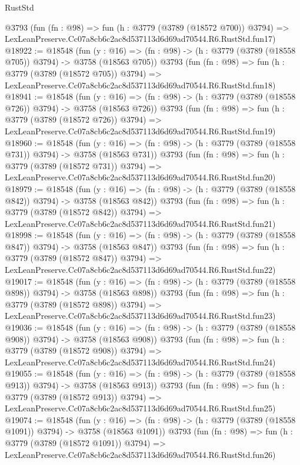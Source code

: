 \begin{lexlean}{RustStd}
\begin{coremodule}
    @3793
    (fun (fn : @98) =>
    fun (h : @3779 (@3789 (@18572 @700)) @3794) =>
    LexLeanPreserve.Cc07a8cb6c2ac8d537113d6d69ad70544.R6.RustStd.fun17)
@18922 := @18548
    (fun (y : @16) => (fn : @98) -> (h : @3779 (@3789 (@18558 @705)) @3794) -> @3758 (@18563 @705))
    @3793
    (fun (fn : @98) =>
    fun (h : @3779 (@3789 (@18572 @705)) @3794) =>
    LexLeanPreserve.Cc07a8cb6c2ac8d537113d6d69ad70544.R6.RustStd.fun18)
@18941 := @18548
    (fun (y : @16) => (fn : @98) -> (h : @3779 (@3789 (@18558 @726)) @3794) -> @3758 (@18563 @726))
    @3793
    (fun (fn : @98) =>
    fun (h : @3779 (@3789 (@18572 @726)) @3794) =>
    LexLeanPreserve.Cc07a8cb6c2ac8d537113d6d69ad70544.R6.RustStd.fun19)
@18960 := @18548
    (fun (y : @16) => (fn : @98) -> (h : @3779 (@3789 (@18558 @731)) @3794) -> @3758 (@18563 @731))
    @3793
    (fun (fn : @98) =>
    fun (h : @3779 (@3789 (@18572 @731)) @3794) =>
    LexLeanPreserve.Cc07a8cb6c2ac8d537113d6d69ad70544.R6.RustStd.fun20)
@18979 := @18548
    (fun (y : @16) => (fn : @98) -> (h : @3779 (@3789 (@18558 @842)) @3794) -> @3758 (@18563 @842))
    @3793
    (fun (fn : @98) =>
    fun (h : @3779 (@3789 (@18572 @842)) @3794) =>
    LexLeanPreserve.Cc07a8cb6c2ac8d537113d6d69ad70544.R6.RustStd.fun21)
@18998 := @18548
    (fun (y : @16) => (fn : @98) -> (h : @3779 (@3789 (@18558 @847)) @3794) -> @3758 (@18563 @847))
    @3793
    (fun (fn : @98) =>
    fun (h : @3779 (@3789 (@18572 @847)) @3794) =>
    LexLeanPreserve.Cc07a8cb6c2ac8d537113d6d69ad70544.R6.RustStd.fun22)
@19017 := @18548
    (fun (y : @16) => (fn : @98) -> (h : @3779 (@3789 (@18558 @898)) @3794) -> @3758 (@18563 @898))
    @3793
    (fun (fn : @98) =>
    fun (h : @3779 (@3789 (@18572 @898)) @3794) =>
    LexLeanPreserve.Cc07a8cb6c2ac8d537113d6d69ad70544.R6.RustStd.fun23)
@19036 := @18548
    (fun (y : @16) => (fn : @98) -> (h : @3779 (@3789 (@18558 @908)) @3794) -> @3758 (@18563 @908))
    @3793
    (fun (fn : @98) =>
    fun (h : @3779 (@3789 (@18572 @908)) @3794) =>
    LexLeanPreserve.Cc07a8cb6c2ac8d537113d6d69ad70544.R6.RustStd.fun24)
@19055 := @18548
    (fun (y : @16) => (fn : @98) -> (h : @3779 (@3789 (@18558 @913)) @3794) -> @3758 (@18563 @913))
    @3793
    (fun (fn : @98) =>
    fun (h : @3779 (@3789 (@18572 @913)) @3794) =>
    LexLeanPreserve.Cc07a8cb6c2ac8d537113d6d69ad70544.R6.RustStd.fun25)
@19074 := @18548
    (fun (y : @16) =>
    (fn : @98) -> (h : @3779 (@3789 (@18558 @1091)) @3794) -> @3758 (@18563 @1091))
    @3793
    (fun (fn : @98) =>
    fun (h : @3779 (@3789 (@18572 @1091)) @3794) =>
    LexLeanPreserve.Cc07a8cb6c2ac8d537113d6d69ad70544.R6.RustStd.fun26)

\end{coremodule}
\end{lexlean}
